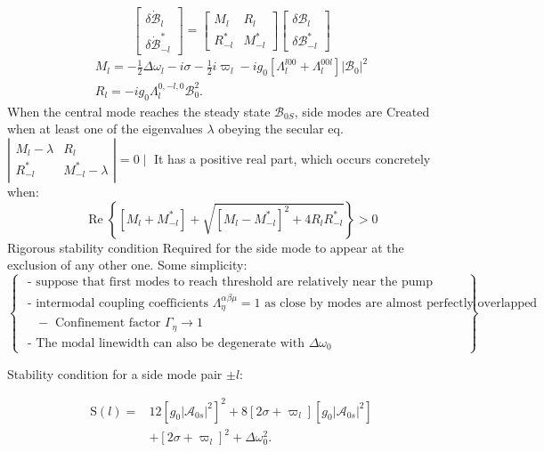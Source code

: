 \documentclass[main.tex]{subfiles}
\begin{document}
$$
\left[\begin{array}{c}
\delta \dot{\mathcal{B}}_l \\
\delta \dot{\mathcal{B}}_{-l}^*
\end{array}\right]=\left[\begin{array}{cc}
M_l & R_l \\
R_{-l}^* & M_{-l}^*
\end{array}\right]\left[\begin{array}{c}
\delta \mathcal{B}_l \\
\delta \mathcal{B}_{-l}^*
\end{array}\right]
$$
$$
\begin{gathered}
M_l=-\frac{1}{2} \Delta \omega_l-i \sigma-\frac{1}{2} i \varpi_l-i g_0\left[\Lambda_l^{l 00}+\Lambda_l^{00 l}\right]\left|\mathcal{B}_0\right|^2 \\
R_l=-i g_0 \Lambda_l^{0,-l, 0} \mathcal{B}_0^2 .
\end{gathered}
$$
When the central mode reaches the steady state $\mathcal{B}_{0 S}$, side modes are Created when at least one of the eigenvalues $\lambda$ obeying the secular eq.
$\left|\begin{array}{lc}M_l-\lambda & R_l \\ R_{-l}^* & M_{-l}^*-\lambda\end{array}\right|=0 \mid$
It has a positive real part, which occurs concretely when:
$$
\operatorname{Re}\left\{\left[M_l+M_{-l}^*\right]+\sqrt{\left[M_l-M_{-l}^*\right]^2+4 R_l R_{-l}^*}\right\}>0
$$
Rigorous stability condition Required for the side mode to appear at the exclusion of any other one.
Some simplicity:
$$
\left\{\begin{array}{c}
\text { - suppose that first modes to reach threshold are relatively near the pump } \\
\text { - intermodal coupling coefficients } \Lambda_\eta^{\alpha \beta \mu}=1 \text { as close by modes are almost perfectly overlapped } \\
\quad-\text { Confinement factor } \Gamma_\eta \rightarrow 1 \\
\text { - The modal linewidth can also be degenerate with } \Delta \omega_0
\end{array}\right\}
$$

Stability condition for a side mode pair $\pm l$:

$$
\begin{aligned}
\mathrm{S}(l)=& 12\left[g_0\left|\mathcal{A}_{0 s}\right|^2\right]^2+8\left[2 \sigma+\varpi_l\right]\left[g_0\left|\mathcal{A}_{0 s}\right|^2\right] \\
&+\left[2 \sigma+\varpi_l\right]^2+\Delta \omega_0^2 .
\end{aligned}
$$
\end{document}
